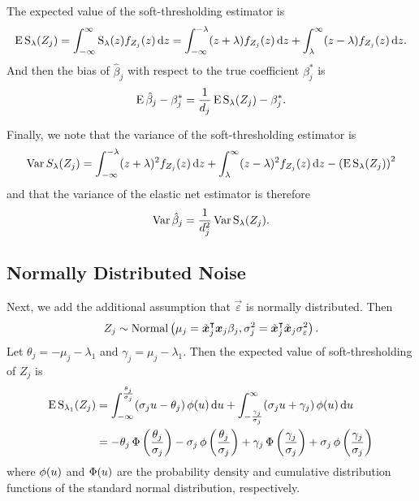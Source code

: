 The expected value of the soft-thresholding estimator is
\begin{equation*}
  \operatorname{E} \operatorname{S}_\lambda({Z_j}) = \int_{-\infty}^\infty \operatorname{S}_\lambda(z) f_{Z_j}(z) \mathop{}\!\mathrm{d} z
  = \int_{-\infty}^{-\lambda}(z + \lambda)f_{Z_j}(z) \mathop{}\!\mathrm{d} z + \int_{\lambda}^\infty (z - \lambda)f_{Z_j}(z) \mathop{}\!\mathrm{d} z.
\end{equation*}
And then the bias of \(\hat\beta_j\) with respect to the true coefficient \(\beta_j^*\) is
\begin{equation*}
  \operatorname{E} \hat\beta_j - \beta_j^* = \frac{1}{d_j}\operatorname{E} \operatorname{S}_\lambda({Z_j}) - \beta^*_j.
\end{equation*}

Finally, we note that the variance of the soft-thresholding estimator is
\begin{equation}
  \label{eq:st-variance}
  \operatorname{Var} {S_\lambda({Z_j})} = \int_{-\infty}^{-\lambda}(z + \lambda)^2f_{Z_j}(z) \mathop{}\!\mathrm{d} z + \int_{\lambda}^\infty (z - \lambda)^2 f_{Z_j}(z) \mathop{}\!\mathrm{d} z - \left(\operatorname{E} \operatorname{S}_\lambda({Z_j})\right)^2
\end{equation}
and that the variance of the elastic net estimator is therefore
\begin{equation*}
  \operatorname{Var} \hat\beta_j = \frac{1}{d_j^2} \operatorname{Var} \operatorname{S}_\lambda({Z_j}).
\end{equation*}

\subsection{Normally Distributed Noise}

Next, we add the additional assumption that \(\vec{\varepsilon}\) is normally distributed.
Then
\[
  {Z_j} \sim \operatorname{Normal}\left(\mu_j = \tilde{\boldsymbol{x}}_j^\intercal\boldsymbol{x}_j \beta_j, \sigma_j^2 = \tilde{\boldsymbol{x}}_j^\intercal\tilde{\boldsymbol{x}}_j \sigma_\varepsilon^2 \right).
\]
Let \(\theta_j = -\mu_j -\lambda_1 \) and \(\gamma_j = \mu_j - \lambda_1\). Then the
expected value of soft-thresholding of \({Z_j}\) is
\begin{align}
  \operatorname{E} \operatorname{S}_{\lambda_1}({Z_j}) & = \int_{-\infty}^\frac{\theta_j}{\sigma_j} (\sigma_j u - \theta_j) \operatorname{\phi}(u) \mathop{}\!\mathrm{d} u + \int_{-\frac{\gamma_j}{\sigma_j}}^\infty (\sigma_j u + \gamma_j) \operatorname{\phi}(u) \mathop{}\!\mathrm{d} u                                               \nonumber                              \\
                            & = -\theta_j \operatorname{\Phi}\left(\frac{\theta_j}{\sigma_j}\right) - \sigma_j \operatorname{\phi}\left(\frac{\theta_j}{\sigma_j}\right) + \gamma_j \operatorname{\Phi}\left(\frac{\gamma_j}{\sigma_j}\right) + \sigma_j \operatorname{\phi}\left(\frac{\gamma_j}{\sigma_j}\right) \label{eq:mean-centered-eval}
\end{align}
where \(\operatorname{\phi}(u)\) and \(\operatorname{\Phi}(u)\) are the probability density and cumulative distribution
functions of the standard normal distribution, respectively.

